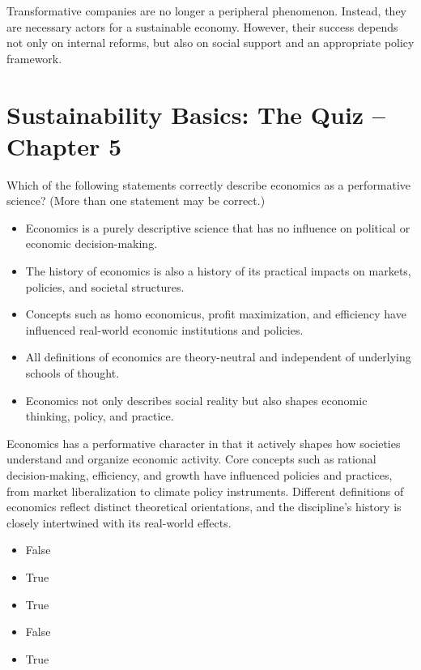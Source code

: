 \documentclass[
  a4paper,
  DIV=11,
  numbers=noendperiod,
  oneside,
  openany]{scrreprt}
\providecommand{\tightlist}{%
  \setlength{\itemsep}{0pt}\setlength{\parskip}{0pt}}
\begin{document}
Transformative companies are no longer a peripheral phenomenon. Instead,
they are necessary actors for a sustainable economy. However, their
success depends not only on internal reforms, but also on social support
and an appropriate policy framework.

\section{Sustainability Basics: The Quiz -- Chapter
5}\label{sustainability-basics-the-quiz-chapter-5}

Which of the following statements correctly describe economics as a
performative science? (More than one statement may be correct.)

\begin{itemize}
\tightlist
\item[$\square$]
  Economics is a purely descriptive science that has no influence on
  political or economic decision-making.
\item[$\square$]
  The history of economics is also a history of its practical impacts on
  markets, policies, and societal structures.
\item[$\square$]
  Concepts such as homo economicus, profit maximization, and efficiency
  have influenced real-world economic institutions and policies.
\item[$\square$]
  All definitions of economics are theory-neutral and independent of
  underlying schools of thought.
\item[$\square$]
  Economics not only describes social reality but also shapes economic
  thinking, policy, and practice.
\end{itemize}

Economics has a performative character in that it actively shapes how
societies understand and organize economic activity. Core concepts such
as rational decision-making, efficiency, and growth have influenced
policies and practices, from market liberalization to climate policy
instruments. Different definitions of economics reflect distinct
theoretical orientations, and the discipline's history is closely
intertwined with its real-world effects.

\begin{itemize}
\tightlist
\item
  False
\item
  True
\item
  True
\item
  False
\item
  True
\end{itemize}
\end{document}
